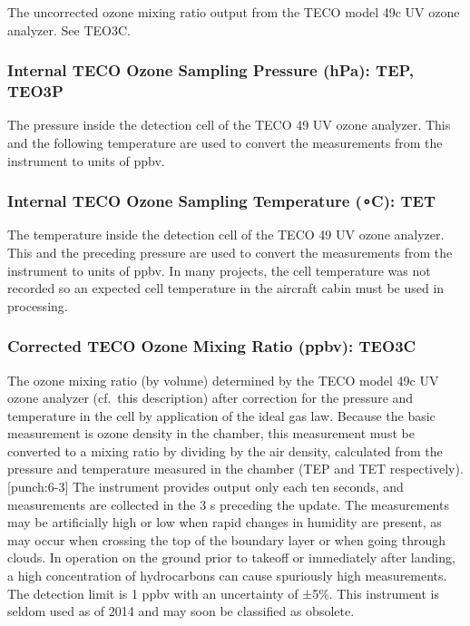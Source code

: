 \documentclass[
  english,
]{book}
\begin{document}
The uncorrected ozone mixing ratio output from the TECO model 49c UV ozone analyzer. See TEO3C.

\hypertarget{tep}{%
\subsubsection*{Internal TECO Ozone Sampling Pressure (hPa): TEP, TEO3P}\label{tep}}

The pressure inside the detection cell of the TECO 49 UV ozone analyzer. This and the following temperature are used to convert the measurements from the instrument to units of ppbv.

\hypertarget{tet}{%
\subsubsection*{\texorpdfstring{Internal TECO Ozone Sampling Temperature ({∘C}): TET}{Internal TECO Ozone Sampling Temperature (∘C): TET}}\label{tet}}

The temperature inside the detection cell of the TECO 49 UV ozone analyzer. This and the preceding pressure are used to convert the measurements from the instrument to units of ppbv. In many projects, the cell temperature was not recorded so an expected cell temperature in the aircraft cabin must be used in processing.

\hypertarget{te03c}{%
\subsubsection*{Corrected TECO Ozone Mixing Ratio (ppbv): TEO3C}\label{te03c}}

The ozone mixing ratio (by volume) determined by the TECO model 49c UV ozone analyzer (cf.~this description) after correction for the pressure and temperature in the cell by application of the ideal gas law. Because the basic measurement is ozone density in the chamber, this measurement must be converted to a mixing ratio by dividing by the air density, calculated from the pressure and temperature measured in the chamber (TEP and TET respectively).\protect\hypertarget{punch:6-3}{}{{[}punch:6-3{]}} The instrument provides output only each ten seconds, and measurements are collected in the 3 s preceding the update. The measurements may be artificially high or low when rapid changes in humidity are present, as may occur when crossing the top of the boundary layer or when going through clouds. In operation on the ground prior to takeoff or immediately after landing, a high concentration of hydrocarbons can cause spuriously high measurements. The detection limit is 1 ppbv with an uncertainty of {±}5\%. This instrument is seldom used as of 2014 and may soon be classified as obsolete.
\end{document}
